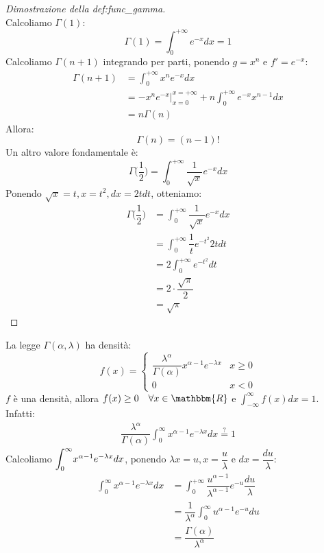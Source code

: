 \documentclass[12pt]{report}
\newcommand{\namerefl}[1]{%
	\bgroup
	\let\nmu\MakeLowercase
	\nameref{#1}\egroup}
\newcommand{\nmu}{}
\begin{document}
	\begin{proof}[Dimostrazione della \namerefl{def:func_gamma}] \quad \\
		Calcoliamo $\Gamma(1)$:
		\[
		\Gamma(1) = \int_{0}^{+\infty}e^{-x}dx = 1
		\]
		Calcoliamo $\Gamma(n + 1)$ integrando per parti, ponendo $g = x^n$ e $f' = e^{-x}$:
		\begin{align*}
		\Gamma(n + 1) &= \int_{0}^{+\infty}x^ne^{-x}dx  \\
		&= -x^ne^{-x} \bigg|^{x=+\infty}_{x=0} + n\int_{0}^{+\infty}e^{-x}x^{n-1}dx \\
		&= n\Gamma(n)
		\end{align*}
		Allora:
		\[
		\Gamma(n) = (n -1)!
		\]
		Un altro valore fondamentale è:
		\[
		\Gamma\bigg(\dfrac{1}{2}\bigg) = \int_{0}^{+\infty}\dfrac{1}{\sqrt{x}}e^{-x}dx
		\]
		Ponendo $\sqrt{x} = t, x = t^2, dx = 2tdt$, otteniamo:
		\begin{align*}
			\Gamma\bigg(\dfrac{1}{2}\bigg) &= \int_{0}^{+\infty}\dfrac{1}{\sqrt{x}}e^{-x}dx \\
			&= \int_{0}^{+\infty}\dfrac{1}{t}e^{-t^2}2tdt \\
			&= 2\int_{0}^{+\infty}e^{-t^2}dt \\
			&= 2 \cdot \dfrac{\sqrt{\pi}}{2} \\
			&= \sqrt{\pi}
		\end{align*}
	\end{proof}
	La legge $\Gamma(\alpha, \lambda)$ ha densità:
	\[
	f(x) = \begin{cases}
		\dfrac{\lambda^\alpha}{\Gamma(\alpha)}x^{\alpha - 1}e^{-\lambda x} & x \geq 0 \\
		0 & x < 0
	\end{cases}
	\]
	$f$ è una densità, allora $f(x) \geq 0 \quad \forall x \in \mathbbm{R}$ e $\int_{-\infty}^{\infty}f(x)dx = 1$. Infatti:
	\begin{align*}
		\dfrac{\lambda^\alpha}{\Gamma(\alpha)}\int_{0}^{\infty}x^{\alpha - 1}e^{-\lambda x}dx \overset{?}{=} 1
	\end{align*}
	Calcoliamo $\mathlarger{\int_{0}^{\infty}}x^{\alpha-1}e^{-\lambda x}dx$, ponendo $\lambda x = u, x = \dfrac{u}{\lambda}$ e $dx = \dfrac{du}{\lambda}$:
	\begin{align*}
		\int_{0}^{\infty}x^{\alpha-1}e^{-\lambda x}dx &= \int_{0}^{+\infty}\dfrac{u^{\alpha - 1}}{\lambda^{\alpha - 1}}e^{-u}\dfrac{du}{\lambda} \\
		&= \dfrac{1}{\lambda^\alpha}\int_{0}^{\infty}u^{\alpha - 1}e^{-u}du \\
		&= \dfrac{\Gamma(\alpha)}{\lambda^{\alpha}}
	\end{align*}
\end{document}
